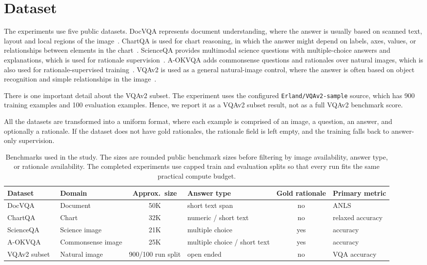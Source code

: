 \documentclass[12pt,bibliography=totoc,listof=totoc,BCOR=5mm,DIV=12,oneside,open=any]{scrbook}
\let\cite\citep
\begin{document}
\section{Dataset}
The experiments use five public datasets.
DocVQA represents document understanding, where the answer is usually based on scanned text, layout and local regions of the image~\cite{mathew2021docvqa}.
ChartQA is used for chart reasoning, in which the answer might depend on labels, axes, values, or relationships between elements in the chart~\cite{masry2022chartqa}.
ScienceQA provides multimodal science questions with multiple-choice answers and explanations, which is used for rationale supervision~\cite{lu2022scienceqa}.
A-OKVQA adds commonsense questions and rationales over natural images, which is also used for rationale-supervised training~\cite{schwenk2022aokvqa}.
VQAv2 is used as a general natural-image control, where the answer is often based on object recognition and simple relationships in the image~\cite{goyal2017vqav2}.

There is one important detail about the VQAv2 subset.
The experiment uses the configured \texttt{Erland/VQAv2-sample} source, which has 900 training examples and 100 evaluation examples.
Hence, we report it as a VQAv2 subset result, not as a full VQAv2 benchmark score.

All the datasets are transformed into a uniform format, where each example is comprised of an image, a question, an answer, and optionally a rationale.
If the dataset does not have gold rationales, the rationale field is left empty, and the training falls back to answer-only supervision.


\begin{table}[!ht]
\centering
\caption{Benchmarks used in the study. The sizes are rounded public benchmark sizes before filtering by image availability, answer type, or rationale availability. The completed experiments use capped train and evaluation splits so that every run fits the same practical compute budget.}
\label{tab:Datasets}
\begin{adjustbox}{max width=\textwidth}
\begin{tabular}{|l|l|c|l|c|l|}
\hline
\textbf{Dataset} & \textbf{Domain} & \textbf{Approx.\ size} & \textbf{Answer type} & \textbf{Gold rationale} & \textbf{Primary metric} \\ \hline
DocVQA~\cite{mathew2021docvqa} & Document & 50K & short text span & no & ANLS \\
ChartQA~\cite{masry2022chartqa} & Chart & 32K & numeric / short text & no & relaxed accuracy \\
ScienceQA~\cite{lu2022scienceqa} & Science image & 21K & multiple choice & yes & accuracy \\
A-OKVQA~\cite{schwenk2022aokvqa} & Commonsense image & 25K & multiple choice / short text & yes & accuracy \\
VQAv2 subset~\cite{goyal2017vqav2} & Natural image & 900/100 run split & open ended & no & VQA accuracy \\ \hline
\end{tabular}
\end{adjustbox}
\end{table}
\end{document}
